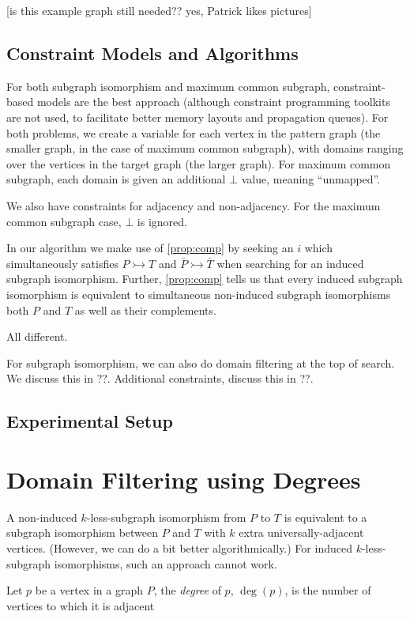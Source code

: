 \documentclass[letterpaper]{article}
\theoremstyle{definition}
\newcommand{\todo}[1]{{\color{red} {[}{#1}{]}}}
\begin{document}
\todo{is this example graph still needed?? yes, Patrick likes pictures}

\subsection{Constraint Models and Algorithms}

For both subgraph isomorphism and maximum common subgraph, constraint-based models are the best
approach (although constraint programming toolkits are not used, to facilitate better memory layouts
and propagation queues). For both problems, we create a variable for each vertex in the pattern
graph (the smaller graph, in the case of maximum common subgraph), with domains ranging over the
vertices in the target graph (the larger graph). For maximum common subgraph, each domain is given
an additional $\bot$ value, meaning ``unmapped''.

We also have constraints for adjacency and non-adjacency. For the maximum common subgraph case,
$\bot$ is ignored.

In our algorithm we make use of \cref{prop:comp} by seeking an $i$ which simultaneously satisfies $P
\rightarrowtail T$ and $\bar{P} \rightarrowtail \bar{T}$ when searching for an induced subgraph
isomorphism.  Further, \cref{prop:comp} tells us that every induced subgraph isomorphism is
equivalent to simultaneous non-induced subgraph isomorphisms both $P$ and $T$ as well as their
complements.

All different.

For subgraph isomorphism, we can also do domain filtering at the top of search. We discuss this in
??. Additional constraints, discuss this in ??.

\subsection{Experimental Setup}

\section{Domain Filtering using Degrees}

A non-induced $k$-less-subgraph isomorphism from $P$ to $T$ is equivalent to a subgraph
isomorphism between $P$ and $T$ with $k$ extra universally-adjacent vertices. (However, we can do a
bit better algorithmically.) For induced $k$-less-subgraph isomorphisms, such an approach cannot
work.

Let $p$ be a vertex in a graph $P$, the \emph{degree} of $p$, $\deg(p)$, is the number of vertices
to which it is adjacent
\end{document}
